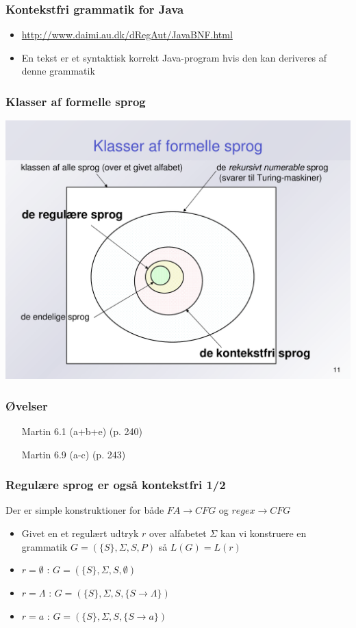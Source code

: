 \documentclass[handout]{beamer}
\begin{document}
\begin{frame}
\frametitle{Kontekstfri grammatik for Java}
\begin{itemize}
\item \url{http://www.daimi.au.dk/dRegAut/JavaBNF.html}
\item En tekst er et syntaktisk korrekt Java-program  
hvis den kan deriveres af denne grammatik
\end{itemize}
\end{frame}

\begin{frame}
\frametitle{Klasser af formelle sprog}
\includegraphics[scale=.4]{images/klasser}
\end{frame}

\begin{frame}
  \frametitle{Øvelser}
  \begin{itemize}[<+->]
  \item  [Martin] 6.1 (a+b+e) (p. 240)
  \item [Martin] 6.9 (a-c) (p. 243)
  \end{itemize}
\end{frame}

\begin{frame}
\frametitle{Regulære sprog er også kontekstfri 1/2}
Der er simple konstruktioner for både $FA\rightarrow CFG$ og $regex \rightarrow CFG$
\begin{itemize}[<+->]
\item Givet en et regulært udtryk $r$ over alfabetet $\Sigma$ kan vi
konstruere en grammatik $G=(\{S\},\Sigma, S, P)$ så $L(G) = L(r)$
\item $r = \emptyset$ : $G=(\{S\},\Sigma, S, \emptyset)$
\item $r = \Lambda$ : $G=(\{S\},\Sigma, S, \{S\rightarrow \Lambda\})$
\item $r = a$ : $G=(\{S\},\Sigma, S, \{S\rightarrow a\})$
\end{itemize}
\end{frame}
\end{document}
